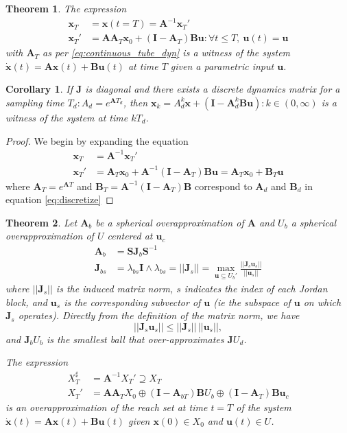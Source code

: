 \documentclass[twocolumn]{autart}    %
\newcommand{\mat}[1]{\boldsymbol{#1}}
\renewcommand{\vec}[1]{\boldsymbol{#1}}
\newtheorem{theorem}{Theorem}
\newtheorem{corollary}{Corollary}
\newtheorem{proof}{Proof}
\begin{document}
\begin{theorem}
The expression
 \begin{align}
 \vec{x}_T&=\vec{x}(t=T)=\mat{A}^{-1}\vec{x}_T'\nonumber\\
\vec{x}_T'&=\mat{A}\mat{A}_T\vec{x}_0 + (\mat{I}-\mat{A}_T)\mat{B}\vec{u} : \forall t \leq T,\ \vec{u}(t)=\vec{u} 
 \end{align}
 with $\mat{A}_T$ as per \eqref{eq:continuous_tube_dyn} is a witness of the system $\dot{\vec{x}}(t)=\mat{A}\vec{x}(t)+\mat{B}\vec{u}(t)$ at time $T$ given a parametric input $\vec{u}$.
 \end{theorem}
 \begin{corollary}
 If $\mat{J}$ is diagonal and there exists a discrete dynamics matrix for a sampling time $T_d :  A_d=e^{\mat{A} T_d}$, then $\vec{x}_k=A_d^k\vec{x}+(\mat{I}-\mat{A}_d^k\mat{B}\vec{u}) : k \in (0,\infty)$ is a witness of the system at time $kT_d$.
 \end{corollary}
 \begin{proof}
 We begin by expanding the equation
 \begin{align}
 \vec{x}_T&=\mat{A}^{-1}\vec{x}_T'\\
 \vec{x}_T'&=\mat{A}_T\vec{x}_0 + \mat{A}^{-1}(\mat{I}-\mat{A}_T)\mat{B}\vec{u} = \mat{A}_T\vec{x}_0 + \mat{B}_T\vec{u}\nonumber
 \end{align}
 where $\mat{A}_T=e^{\mat{A}T}$ and $\mat{B}_T=\mat{A}^{-1}(\mat{I}-\mat{A}_T)\mat{B}$ correspond to $\mat{A}_d$ and $\mat{B}_d$ in equation \eqref{eq:discretize}
 \end{proof}
 \begin{theorem}
Let $\mat{A}_b$ be a spherical overapproximation of $\mat{A}$ and $U_b$ a spherical overapproximation of $U$ centered at $\vec{u}_c$
\begin{align}
\mat{A}_b&=\mat{S} \mat{J}_b \mat{S}^{-1}\\
\mat{J}_{bs}&=\lambda_{bs}\mat{I} \wedge \lambda_{bs}=|| \mat{J}_s ||=
\max_{\vec{u} \subseteq U_b'} \frac{|| \mat{J}_s\vec{u}_s ||}{||
  \vec{u}_s ||}\nonumber
\label{eq:induced}
\end{align}
where $|| \mat{J}_s ||$ is the induced matrix norm, $s$ indicates the index of each Jordan block, and $\vec{u}_s$ is the corresponding subvector of $\vec{u}$ (\emph{ie} the subspace of $\vec{u}$ on which $\mat{J}_s$ operates).
Directly from the definition of the matrix norm, we have 
\begin{equation}
||\mat{J}_s\vec{u}_s|| \leq ||\mat{J}_s||\,||\vec{u}_s||, 
\label{eq:overinduced}
\end{equation}
and $\mat{J}_{b} U_b$ is the smallest ball that over-approximates $\mat{J}  U_d$.

The expression
 \begin{align}
X_T^\sharp &=\mat{A}^{-1}X_T'\supseteq X_T\\
X_T'&=\mat{A}\mat{A}_TX_0 \oplus (\mat{I}-\mat{A}_{bT})\mat{B}U_b \oplus (\mat{I}-\mat{A}_T)\mat{B}\vec{u}_c\nonumber
 \end{align}
 is an overapproximation of the reach set  at time $t=T$ of the system $\dot{\vec{x}}(t)=\mat{A}\vec{x}(t) + \mat{B}\vec{u}(t)$ given $\vec{x}(0) \in X_0$ and $\vec{u}(t) \in U$.
 \end{theorem}
\end{document}
